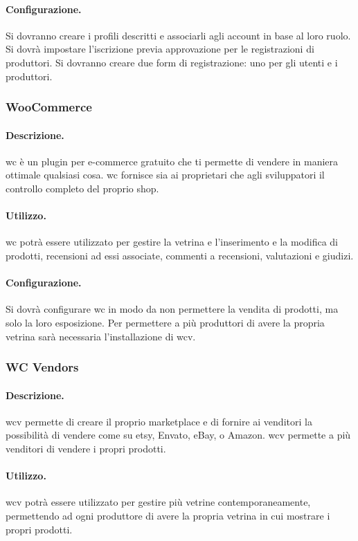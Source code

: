 \paragraph{Configurazione.}  Si dovranno creare i profili descritti e associarli agli account in base al loro ruolo. Si dovrà impostare l'iscrizione previa approvazione per le registrazioni di produttori. Si dovranno creare due form di registrazione: uno per gli utenti e i produttori.

\subsubsection{WooCommerce} \label{plugin:wc}
\paragraph{Descrizione.} \gls{wc} è un plugin per e-commerce gratuito che ti permette di vendere in maniera ottimale qualsiasi cosa. \gls{wc} fornisce sia ai proprietari che agli sviluppatori il controllo completo del proprio shop.
\paragraph{Utilizzo.} \gls{wc} potrà essere utilizzato per gestire la vetrina e l'inserimento e la modifica di prodotti, recensioni ad essi associate, commenti a recensioni, valutazioni e giudizi.
\paragraph{Configurazione.} Si dovrà configurare \gls{wc} in modo da non permettere la vendita di prodotti, ma solo la loro esposizione.
Per permettere a più produttori di avere la propria vetrina sarà necessaria l'installazione di \gls{wcv}.

\subsubsection{WC Vendors} \label{plugin:wcv}
\paragraph{Descrizione.} \gls{wcv} permette di creare il proprio marketplace e di fornire ai venditori la possibilità di vendere come su etsy, Envato, eBay, o Amazon. \gls{wcv} permette a più venditori di vendere i propri prodotti.
\paragraph{Utilizzo.} \gls{wcv} potrà essere utilizzato per gestire più vetrine contemporaneamente, permettendo ad ogni produttore di avere la propria vetrina in cui mostrare i propri prodotti.
